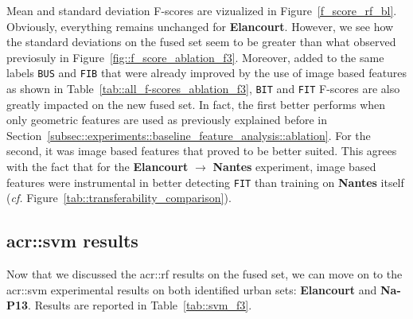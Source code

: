         Mean and standard deviation F-scores are vizualized in Figure~\ref{f_score_rf_bl}.
        Obviously, everything remains unchanged for \textbf{Elancourt}.
        However, we see how the standard deviations on the fused set seem to be greater than what observed previosuly in Figure~\ref{fig::f_score_ablation_f3}.
        Moreover, added to the same labels \texttt{BUS} and \texttt{FIB} that were already improved by the use of image based features as shown in Table~\ref{tab::all_f-scores_ablation_f3}, \texttt{BIT} and \texttt{FIT} F-scores are also greatly impacted on the new fused set.
        In fact, the first better performs when only geometric features are used as previously explained before in Section~\ref{subsec::experiments::baseline_feature_analysis::ablation}.
        For the second, it was image based features that proved to be better suited.
        This agrees with the fact that for the \textbf{Elancourt} \(\rightarrow\) \textbf{Nantes} experiment, image based features were instrumental in better detecting \texttt{FIT} than training on \textbf{Nantes} itself (\textit{cf.} Figure~\ref{tab::transferability_comparison}).
        
    \subsection{\texorpdfstring{\acrshort*{acr::svm}}{SVM} results}
        \label{subsec::more_experiments::classifier::svm}
        Now that we discussed the \gls{acr::rf} results on the fused set, we can move on to the \gls{acr::svm} experimental results on both identified urban sets: \textbf{Elancourt} and \textbf{Na-P13}.
        Results are reported in Table~\ref{tab::svm_f3}.\\

